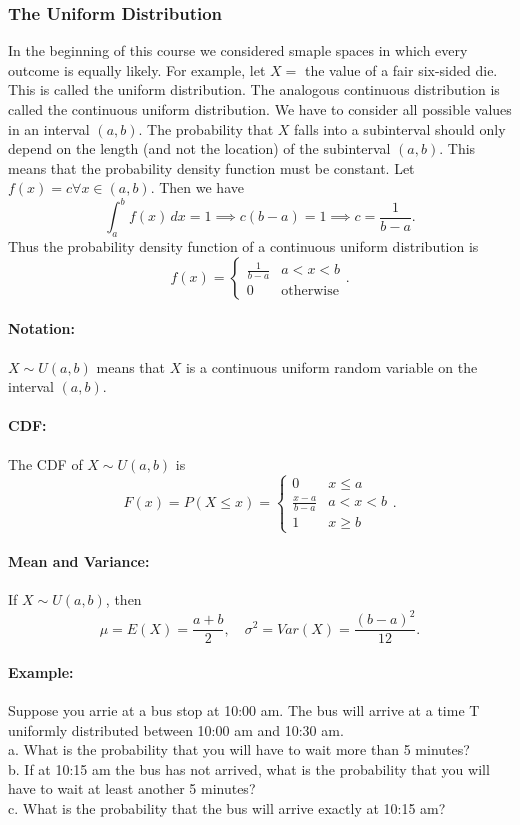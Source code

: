 \pagebreak

\subsubsection*{The Uniform Distribution}
\hrulefill

In the beginning of this course we considered smaple spaces in which every outcome is equally likely.
For example, let $X =$ the value of a fair six-sided die.
This is called the uniform distribution. The analogous continuous distribution is called the continuous 
uniform distribution. We have to consider all possible values in an interval $(a,b)$. The probability that $X$
falls into a subinterval should only depend on the length (and not the location) of the subinterval $(a,b)$.
This means that the probability density function must be constant. Let $f(x) = c \forall x \in (a,b)$.
Then we have
\[\int_a^b f(x) \, dx = 1 \implies c(b-a) = 1 \implies c = \frac{1}{b-a}.\]
Thus the probability density function of a continuous uniform distribution is
\[f(x) = \begin{cases}
\frac{1}{b-a} & a < x < b \\
0 & \text{otherwise}
\end{cases}.\]

\paragraph*{Notation:} $X \sim U(a,b)$ means that $X$ is a continuous uniform random variable on the 
interval $(a,b)$.

\paragraph*{CDF:} The CDF of $X \sim U(a,b)$ is
\[F(x) = P(X \leq x) = \begin{cases}
0 & x \leq a \\
\frac{x-a}{b-a} & a < x < b \\
1 & x \geq b
\end{cases}.\]

\paragraph*{Mean and Variance:} If $X \sim U(a,b)$, then
\[\mu = E(X) = \frac{a+b}{2}, \quad \sigma^2 = Var(X) = \frac{(b-a)^2}{12}.\]

\pagebreak

\paragraph*{Example:}
Suppose you arrie at a bus stop at 10:00 am. The bus will arrive at a time T uniformly distributed between 
10:00 am and 10:30 am.\\
a. What is the probability that you will have to wait more than 5 minutes?\\
b. If at 10:15 am the bus has not arrived, what is the probability that you will have to wait 
at least another 5 minutes?\\
c. What is the probability that the bus will arrive exactly at 10:15 am?

